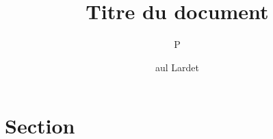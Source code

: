 \documentclass{article}
\begin{document}
	\author{\subtitle Paul Lardet}
	\title{\Huge \bigtitle Titre du document \vspace{-0,4em}}
	\date{}
	\maketitle

\section{\partie Section}
\end{document}

